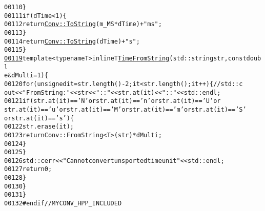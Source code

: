 \begin{footnotesize}
\begin{alltt}
00110             \}
00111             \textcolor{keywordflow}{if}(dTime < 1)\{
00112                 \textcolor{keywordflow}{return} \hyperlink{group__libbuskol_ga0b261d6de4c26434d56ba40d00daa68a}{Conv::ToString}(m\_MS * dTime)+\textcolor{stringliteral}{"ms"};
00113             \}
00114             \textcolor{keywordflow}{return} \hyperlink{group__libbuskol_ga0b261d6de4c26434d56ba40d00daa68a}{Conv::ToString}(dTime)+\textcolor{stringliteral}{"s"};
00115         \}
\hypertarget{myConv_8hpp_source_l00119}{}\hyperlink{group__libbuskol_gad76da3426fefe4b30feba7c0e170dccd}{00119}         \textcolor{keyword}{template} <\textcolor{keyword}{typename} T> \textcolor{keyword}{inline} T \hyperlink{group__libbuskol_gad76da3426fefe4b30feba7c0e170dccd}{TimeFromString}(std::string str,\textcolor{keyword}{const} \textcolor{keywordtype}{doubl
      e} &dMulti =1)\{
00120             \textcolor{keywordflow}{for} (\textcolor{keywordtype}{unsigned} it = str.length()-2; it < str.length(); it++)\{ \textcolor{comment}{//std::c
      out<<"FromString: "<<str<<"::"<<str.at(it)<<"::"<<std::endl;}
00121                 \textcolor{keywordflow}{if}(str.at(it) == \textcolor{charliteral}{'N'} or str.at(it) == \textcolor{charliteral}{'n'} or str.at(it) == \textcolor{charliteral}{'U'} or
       str.at(it) == \textcolor{charliteral}{'u'} or str.at(it) == \textcolor{charliteral}{'M'} or str.at(it) == \textcolor{charliteral}{'m'} or str.at(it) == \textcolor{charliteral}{'S'
      } or str.at(it) == \textcolor{charliteral}{'s'})\{
00122                     str.erase(it);
00123                     \textcolor{keywordflow}{return} Conv::FromString<T>(str) * dMulti;
00124                 \}
00125             \}
00126             std::cerr<<\textcolor{stringliteral}{"Cannot convert unsported time unit"}<<std::endl;
00127             \textcolor{keywordflow}{return} 0;
00128         \}
00130     \}
00131 \}
00132 \textcolor{preprocessor}{#endif // MYCONV\_HPP\_INCLUDED}
\end{alltt}\end{footnotesize}

